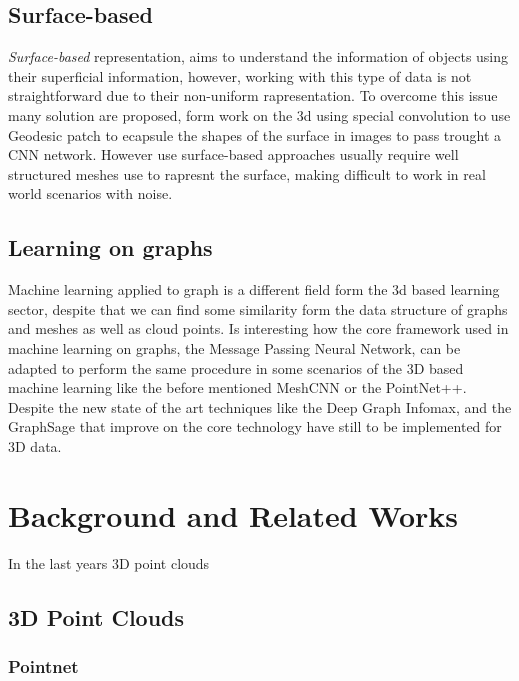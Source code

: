 \documentclass[12pt]{article}
\begin{document}
\subsection{Surface-based}
\textit{Surface-based} representation, aims to understand the information of objects using their superficial information, 
however, working with this type of data is not straightforward due to their non-uniform rapresentation.
To overcome this issue many solution are proposed, form work on the 3d using special convolution\cite{Hanocka_2019} to use Geodesic patch to ecapsule the shapes of the surface in images to pass trought a CNN network\cite{masci2015geodesic}.
However use surface-based approaches usually require well structured meshes use to rapresnt the surface, making difficult to work in real world scenarios with noise.

\subsection{Learning on graphs}
Machine learning applied to graph is a different field form the 3d based learning sector, despite that we can find some similarity form the data structure of graphs and meshes as well as cloud points.
Is interesting how the core framework used in machine learning on graphs, the Message Passing Neural Network\cite{gilmer2017neural},  can be adapted to perform the same procedure in some scenarios of the 3D based machine learning like the before mentioned MeshCNN\cite{} or the PointNet++\cite{}.
Despite the new state of the art techniques like the Deep Graph Infomax\cite{velikovi2018deep}, and the GraphSage\cite{hamilton2017inductive} that improve on the core technology have still to be implemented for 3D data.


\section{Background and Related Works}
In the last years 3D point clouds 
\subsection{3D Point Clouds}

\subsubsection{Pointnet}
\end{document}
